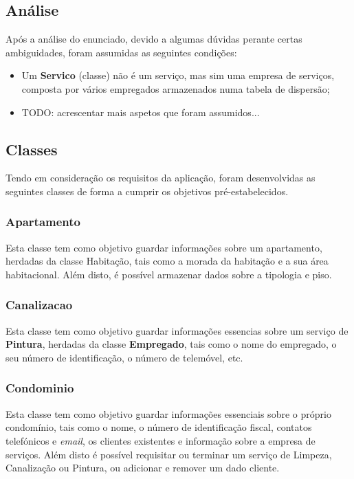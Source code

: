 \documentclass[a4paper]{article}
\begin{document}
\subsection{Análise}

Após a análise do enunciado, devido a algumas dúvidas perante certas ambiguidades, foram assumidas as seguintes condições:

\begin{itemize}

	\item Um \textbf{Servico} (classe) não é um serviço, mas sim uma empresa de serviços, composta por vários empregados armazenados numa tabela de dispersão;
	\item TODO: acrescentar mais aspetos que foram assumidos...

\end{itemize}

\subsection{Classes}

Tendo em consideração os requisitos da aplicação, foram desenvolvidas as seguintes classes de forma a cumprir os objetivos pré-estabelecidos.

\subsubsection{Apartamento}

Esta classe tem como objetivo guardar informações sobre um apartamento, herdadas da classe Habitação, tais como a morada da habitação e a sua área habitacional. Além disto, é possível armazenar dados sobre a tipologia e piso.

\subsubsection{Canalizacao}

Esta classe tem como objetivo guardar informações essencias sobre um serviço de \textbf{Pintura}, herdadas da classe \textbf{Empregado}, tais como o nome do empregado, o seu número de identificação, o número de telemóvel, etc.

\subsubsection{Condominio}

Esta classe tem como objetivo guardar informações essenciais sobre o próprio condomínio, tais como o nome, o número de identificação fiscal, contatos telefónicos e \textit{email}, os clientes existentes e informação sobre a empresa de serviços. Além disto é possível requisitar ou terminar um serviço de Limpeza, Canalização ou Pintura, ou adicionar e remover um dado cliente.
\end{document}

